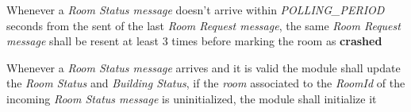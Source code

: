 \begin{req_enum}
\begin{req_enum}[label*=\arabic*.]
\begin{req_enum}[label*=\arabic*.]
							\item Whenever a \textit{Room Status message} doesn't arrive within \textit{POLLING\_PERIOD}  seconds from the sent of the last \textit{Room Request message}, the same \textit{Room Request message} shall be resent at least 3 times before marking the room as \textbf{crashed}
							\item Whenever a \textit{Room Status message} arrives and it is valid the module shall update the \textit{Room Status} and \textit{Building Status}, if the \textit{room} associated to the \textit{RoomId} of the incoming \textit{Room Status message} is uninitialized, the module shall initialize it
						\end{req_enum}
				\end{req_enum}	
		\end{req_enum}
